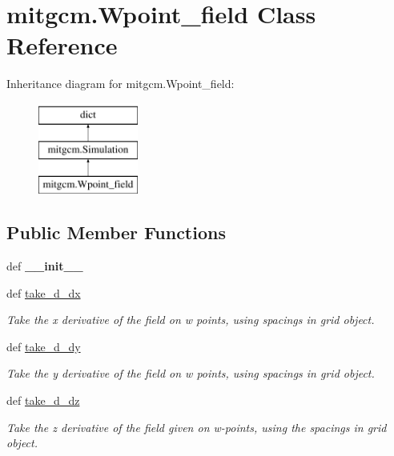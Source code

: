 \hypertarget{classmitgcm_1_1Wpoint__field}{\section{mitgcm.\+Wpoint\+\_\+field Class Reference}
\label{classmitgcm_1_1Wpoint__field}
}
Inheritance diagram for mitgcm.\+Wpoint\+\_\+field\+:\begin{figure}[H]
\begin{center}
\leavevmode
\includegraphics[height=3.000000cm]{classmitgcm_1_1Wpoint__field}
\end{center}
\end{figure}
\subsection*{Public Member Functions}
\begin{DoxyCompactItemize}
\item 
\hypertarget{classmitgcm_1_1Wpoint__field_a3ced97045b1e09ecbbaa5838182202c6}{def {\bfseries \+\_\+\+\_\+init\+\_\+\+\_\+}}\label{classmitgcm_1_1Wpoint__field_a3ced97045b1e09ecbbaa5838182202c6}

\item 
def \hyperlink{classmitgcm_1_1Wpoint__field_a9d36e2a9cc0545fb08a7b914968aa75a}{take\+\_\+d\+\_\+dx}
\begin{DoxyCompactList}\small\item\em Take the x derivative of the field on w points, using spacings in grid object. \end{DoxyCompactList}\item 
def \hyperlink{classmitgcm_1_1Wpoint__field_a669146364af5537c435957e297b41f57}{take\+\_\+d\+\_\+dy}
\begin{DoxyCompactList}\small\item\em Take the y derivative of the field on w points, using spacings in grid object. \end{DoxyCompactList}\item 
def \hyperlink{classmitgcm_1_1Wpoint__field_a7edd07d71d411e7f41acb496cc054bd0}{take\+\_\+d\+\_\+dz}
\begin{DoxyCompactList}\small\item\em Take the z derivative of the field given on w-\/points, using the spacings in grid object. \end{DoxyCompactList}\end{DoxyCompactItemize}
